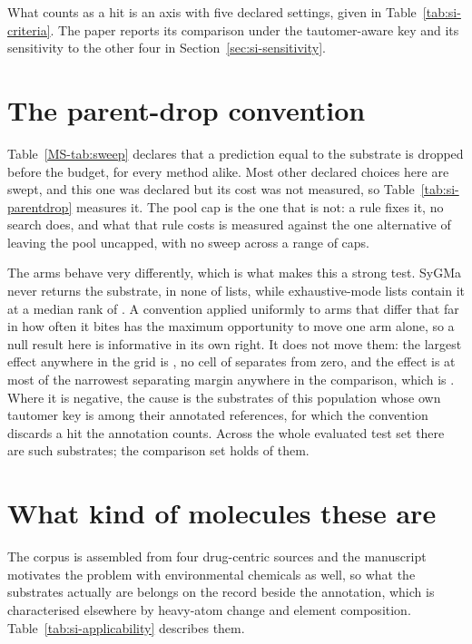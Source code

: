 \documentclass[journal=jcisd8,manuscript=suppinfo,layout=onecolumn]{achemso}
\begin{document}


What counts as a hit is an axis with five declared settings, given in Table~\ref{tab:si-criteria}.
The paper reports its comparison under the tautomer-aware key and its sensitivity to the other
four in Section~\ref{sec:si-sensitivity}.

\section{The parent-drop convention}
\label{sec:si-parentdrop}



Table~\ref{MS-tab:sweep} declares that a prediction equal to the substrate is dropped before the
budget, for every
method alike. Most other declared choices here are swept, and this one was declared but its cost
was not measured, so Table~\ref{tab:si-parentdrop} measures it. The pool cap is the one that is
not: a rule fixes it, no search does, and what that rule costs is measured against the one
alternative of leaving the pool uncapped, with no sweep across a range of caps.

The arms behave very differently, which is what makes this a strong test.
SyGMa never returns the substrate, in none of \numPopulationN{} lists, while
\numPdropReturnsBank{} exhaustive-mode lists contain it at a median rank of
\numPdropMedrankBank{}. A convention applied uniformly to arms that differ that far in how often
it bites has the maximum opportunity to move one arm alone, so a null result here is
informative in its own right. It does not move them: the
largest effect anywhere in the grid is \numPdropMaxEffect{}, no cell of
\numPdropCells{} separates from zero, and the effect is at most \numPdropShareofmarginPct{} of the
narrowest
separating margin anywhere in the comparison, which is \numPdropNarrowestmargin{}. Where it is
negative, the cause is the \numPdropSelfref{} substrates of this population whose
own tautomer key is among their annotated references, for which the convention discards a hit the
annotation counts. Across the whole evaluated test set there are \numRefauditSelfref{} such
substrates; the comparison set holds \numPdropSelfref{} of them.

\section{What kind of molecules these are}
\label{sec:si-applicability}

The corpus is assembled from four drug-centric sources and the manuscript motivates the problem
with environmental chemicals as well, so what the substrates actually are belongs on the record
beside the annotation, which is characterised elsewhere by heavy-atom change and element
composition. Table~\ref{tab:si-applicability} describes them.
\end{document}
